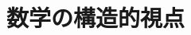\documentclass[../book_need-set-theory]{subfiles}
\begin{document}
\section{数学の構造的視点}
\end{document}
